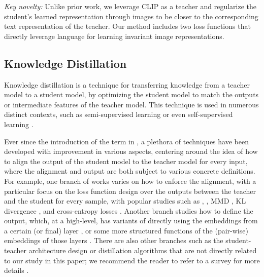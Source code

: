 \documentclass[10pt,twocolumn,letterpaper]{article}
\begin{document}
\emph{Key novelty:} Unlike prior work, we leverage CLIP as a teacher and regularize the student's learned representation through images to be closer to the corresponding text representation of the teacher. Our method includes two loss functions that directly leverage language for learning invariant image representations. 

\subsection{Knowledge Distillation}
Knowledge distillation is a technique for transferring knowledge from a teacher model to a student model, 
by optimizing the student model to match the outputs or intermediate features of the teacher model. 
This technique is used in numerous distinct contexts, such as semi-supervised learning \cite{orbes2019knowledge} or even self-supervised learning \cite{xu2020knowledge}.

Ever since the introduction of the term in 
\cite{DBLP:journals/corr/HintonVD15}, 
a plethora of techniques have been developed \cite{gou2021knowledge}
with improvement in various aspects, 
centering around the idea of 
how to align the output of the student model 
to the teacher model for every input, 
where the alignment and output are both subject to various concrete definitions. 
For example, 
one branch of works varies on how to enforce the alignment, 
with a particular focus on the loss function design 
over the outputs between the teacher and the student for every sample, 
with popular studies such as  \cite{DBLP:conf/nips/KimPK18},  \cite{DBLP:journals/tnn/ChenWXXT21,DBLP:conf/aaai/PassbanWRL21,DBLP:conf/eccv/WangFLWLM20}, 
MMD \cite{DBLP:journals/corr/HuangW17a}, 
KL divergence \cite{DBLP:conf/aaai/ChenWZ18,DBLP:journals/tnn/PassalisTT21,DBLP:conf/cvpr/PassalisTT20}, 
and cross-entropy losses \cite{DBLP:conf/eccv/XuRLG20,DBLP:conf/cvpr/LiuWGTCOK19}.
Another branch studies how to define the output, which, 
at a high-level, 
has variants of directly using the embeddings from a certain (or final) layer \cite{DBLP:journals/corr/abs-2003-04289,DBLP:conf/eccv/GuanZWZYBT20,DBLP:conf/iccv/HeoKYPK019,DBLP:conf/aaai/ShenWSSS19}, 
or some more structured functions of the (pair-wise) embeddings of those layers \cite{DBLP:conf/fgr/LiPZ21,DBLP:conf/ijcai/ZhangP18a,DBLP:conf/cvpr/YimJBK17}.
There are also other branches 
such as the student-teacher architecture design 
or distillation algorithms that are not directly related to our study in this paper; 
we recommend the reader to refer to a survey for more details \cite{gou2021knowledge}. 
\end{document}
